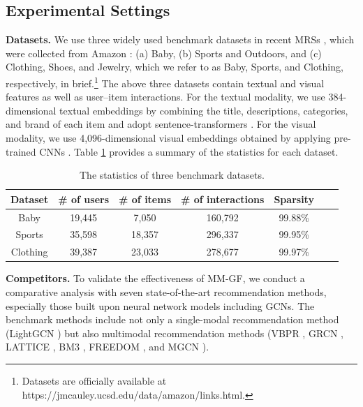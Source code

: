 \documentclass[a4paper,fleqn]{cas-sc}
\renewcommand{\cite}{\citep}
\begin{document}
\subsection{Experimental Settings}

\noindent\textbf{Datasets.} We use three widely used benchmark datasets in recent MRSs \cite{DBLP:conf/mm/Zhang00WWW21, DBLP:conf/mm/Yu0LB23, DBLP:conf/mm/ZhouS23, zhou2023comprehensive}, which were collected from Amazon \cite{DBLP:conf/sigir/McAuleyTSH15}: (a) Baby, (b) Sports and Outdoors, and (c) Clothing, Shoes, and Jewelry, which we refer to as Baby, Sports, and Clothing, respectively, in brief.\footnote{Datasets are officially available at https://jmcauley.ucsd.edu/data/amazon/links.html.} The above three datasets contain textual and visual features as well as user--item interactions. For the textual modality, we use 384-dimensional textual embeddings by combining the title, descriptions, categories, and brand of each item and adopt sentence-transformers \cite{DBLP:conf/emnlp/ReimersG19}. For the visual modality, we use 4,096-dimensional visual embeddings obtained by applying pre-trained CNNs \cite{DBLP:conf/www/HeM16}. Table \ref{table:datasets} provides a summary of the statistics for each dataset.

\begin{table}[!t]
\footnotesize
  \captionsetup{skip=2pt}
  \caption{The statistics of three benchmark datasets.}
  \begin{tabular}{ccccccl}
    \toprule
    Dataset & \# of users & \# of items & \# of interactions & Sparsity \\
    \midrule
    Baby & 19,445 & 7,050 & 160,792 & 99.88\%\\
    Sports & 35,598 & 18,357 & 296,337 & 99.95\%\\
    Clothing & 39,387 & 23,033 & 278,677 & 99.97\% \\
  \bottomrule
\end{tabular}
\vspace{-2mm}
\label{table:datasets}
\end{table}

\noindent\textbf{Competitors.} To validate the effectiveness of \textsf{MM-GF}, we conduct a comparative analysis with seven state-of-the-art recommendation methods, especially those built upon neural network models including GCNs. The benchmark methods include not only a single-modal recommendation method (LightGCN \cite{DBLP:conf/sigir/0001DWLZ020}) but also multimodal recommendation methods (VBPR \cite{DBLP:conf/aaai/HeM16}, GRCN \cite{DBLP:conf/mm/WeiWN0C20}, LATTICE \cite{DBLP:conf/mm/Zhang00WWW21}, BM3 \cite{DBLP:conf/www/ZhouZLZMWYJ23}, FREEDOM \cite{DBLP:conf/mm/ZhouS23}, and MGCN \cite{DBLP:conf/mm/Yu0LB23}).
\end{document}
